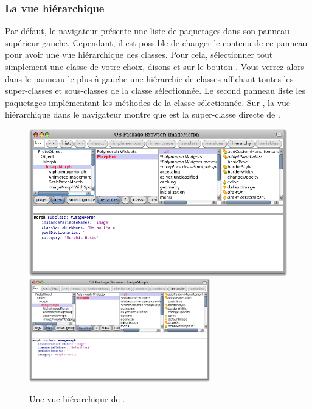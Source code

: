 \documentclass[a4paper,10pt,twoside]{book}
\begin{document}
\subsubsection{La vue hiérarchique}

Par défaut, le navigateur présente une liste de paquetages dans son
panneau supérieur gauche.
Cependant, il est possible de changer le contenu de ce panneau pour
avoir une vue hiérarchique des classes. Pour cela, sélectionner tout
simplement une classe de votre choix, disons  et \click
sur le bouton .
Vous verrez alors dans le panneau le plus à gauche une hiérarchie de
classes affichant toutes les super-classes et sous-classes de la
classe sélectionnée.
Le second panneau liste les paquetages implémentant les
méthodes de la classe sélectionnée. %
Sur , la vue hiérarchique dans le navigateur 
montre que  est la super-classe directe de
\mbox{.}

\begin{figure}[btp]
	\begin{center}
   \ifluluelse
		{\includegraphics[width=\textwidth]{hierarchyBrowser}}
		{\includegraphics[width=0.7\textwidth]{hierarchyBrowser}}
	\end{center}
	\caption{Une vue hiérarchique de .}
\end{figure}
\end{document}
